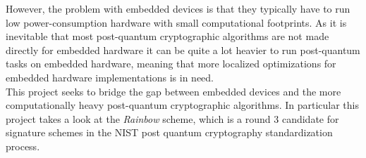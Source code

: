 However, the problem with embedded devices is that they typically have to run low power-consumption hardware with small computational footprints. As it is inevitable that most post-quantum cryptographic algorithms are not made directly for embedded hardware it can be quite a lot heavier to run post-quantum tasks on embedded hardware, meaning that more localized optimizations for embedded hardware implementations is in need.\medskip\\
This project seeks to bridge the gap between embedded devices and the more computationally heavy post-quantum cryptographic algorithms. In particular this project takes a look at the \textit{Rainbow} scheme, which is a round 3 candidate for signature schemes in the NIST post quantum cryptography standardization process.
\pagebreak